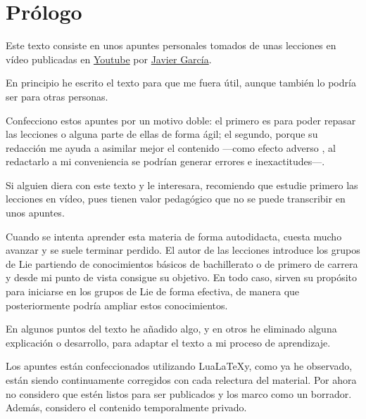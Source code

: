 %

\chapter{Prólogo}
Este texto consiste en unos apuntes personales tomados
de unas lecciones en vídeo publicadas en
\href{%
  https://www.youtube.com/watch?v=4NE-KNwHKSI\&list=PLAnA8FVrBl8DTFTMP8kXbDnRJHQKqfjaw
}
{Youtube}
por \href{https://www.patreon.com/JavierGarcia/}{Javier García}.

En principio he escrito el texto para que me fuera útil, aunque también lo podría ser para otras personas.

Confecciono estos apuntes por un motivo doble: el primero es para poder repasar las lecciones o alguna parte de ellas de forma ágil; el segundo, porque su redacción me ayuda a asimilar mejor el contenido ---como efecto adverso , al redactarlo a mi conveniencia se podrían generar errores e inexactitudes---.

Si alguien diera con este texto y le interesara, recomiendo que estudie primero las lecciones en vídeo, pues tienen valor pedagógico que no se puede transcribir en unos apuntes.

Cuando se intenta aprender esta materia de forma autodidacta, cuesta mucho avanzar y se suele terminar perdido. El autor de las lecciones introduce los grupos de Lie partiendo de conocimientos básicos de bachillerato o de primero de carrera y desde mi punto de vista consigue su objetivo. En todo caso, sirven su propósito para iniciarse en los grupos de Lie de forma efectiva, de manera que posteriormente podría ampliar estos conocimientos.

En algunos puntos del texto he añadido algo, y en otros he eliminado alguna explicación o desarrollo, para adaptar el texto a mi proceso de aprendizaje.

Los apuntes están confeccionados utilizando Lua\LaTeX y, como ya he observado, están siendo continuamente corregidos con cada relectura del material. Por ahora no considero que estén listos para ser publicados y los marco como un borrador. Además, considero el contenido temporalmente privado.


 
